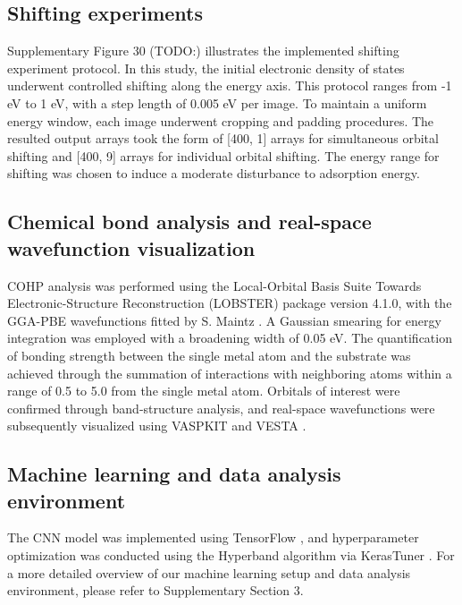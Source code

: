 \subsection{Shifting experiments}
Supplementary Figure 30 (TODO:) illustrates the implemented shifting experiment protocol.
In this study, the initial electronic density of states underwent controlled shifting along the energy axis.
This protocol ranges from -1 eV to 1 eV, with a step length of 0.005 eV per image.
To maintain a uniform energy window, each image underwent cropping and padding procedures.
The resulted output arrays took the form of [400, 1] arrays for simultaneous orbital shifting and [400, 9] arrays for individual orbital shifting.
The energy range for shifting was chosen to induce a moderate disturbance to adsorption energy.


\subsection{Chemical bond analysis and real-space wavefunction visualization}
COHP analysis was performed using the Local-Orbital Basis Suite Towards Electronic-Structure Reconstruction (LOBSTER) package  \cite{deringer2011crystal, koga1999analytical, nelson2020lobster, maintz2013analytic, dronskowski1993crystal} version 4.1.0, with the GGA-PBE wavefunctions fitted by S. Maintz \cite{koga1999analytical, maintz2016lobster}.
A Gaussian smearing for energy integration was employed with a broadening width of 0.05 eV.
The quantification of bonding strength between the single metal atom and the substrate was achieved through the summation of interactions with neighboring atoms within a range of 0.5 \text{\AA} to 5.0 \text{\AA} from the single metal atom.
Orbitals of interest were confirmed through band-structure analysis, and real-space wavefunctions were subsequently visualized using VASPKIT \cite{wang2021vaspkit} and VESTA \cite{momma2008vesta}.


\subsection{Machine learning and data analysis environment}
The CNN model was implemented using TensorFlow \cite{abadi2016tensorflow}, and hyperparameter optimization was conducted using the Hyperband \cite{li2018hyperband} algorithm via KerasTuner \cite{omalley2019kerastuner}.
For a more detailed overview of our machine learning setup and data analysis environment, please refer to Supplementary Section 3.
